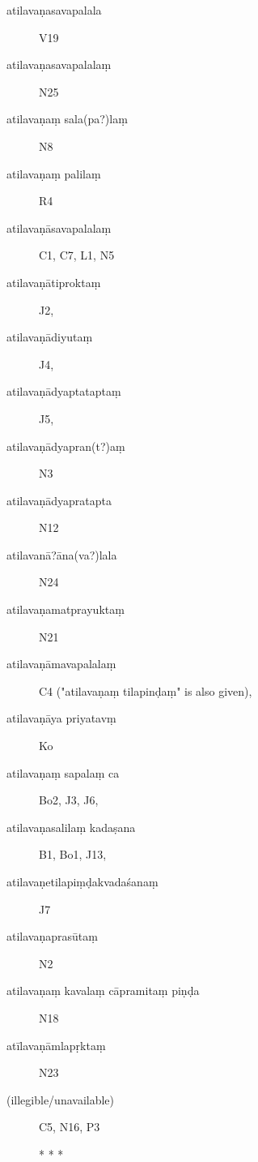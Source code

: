 \begin{ekdosis}
\begin{marma}[hp01_055]
\begin{marma}[hp01_060]
\begin{description}
      \item[atilavaṇasavapalala]        V19
      \item[atilavaṇasavapalalaṃ]   N25
      \item[atilavaṇaṃ sala(pa?)laṃ]   N8
      \item[atilavaṇaṃ palilaṃ]         R4
      \item[atilavaṇāsavapalalaṃ]        C1, C7, L1, N5
      \item[atilavaṇātiproktaṃ]        J2,
      \item[atilavaṇādiyutaṃ]        J4,
      \item[atilavaṇādyaptataptaṃ]        J5,
      \item[atilavaṇādyapran(t?)aṃ]  N3
      \item[atilavaṇādyapratapta]   N12
      \item[atilavanā?āna(va?)lala]   N24
      \item[atilavaṇamatprayuktaṃ]   N21
      \item[atilavaṇāmavapalalaṃ]        C4 ("atilavaṇaṃ tilapinḍaṃ" is also given),
      \item[atilavaṇāya priyatavṃ]        Ko
      \item[atilavaṇaṃ sapalaṃ ca]        Bo2, J3, J6,
      \item[atilavaṇasalilaṃ kadaṣana]        B1, Bo1, J13,
      \item[atilavaṇetilapiṃḍakvadaśanaṃ]        J7
      \item[atilavaṇaprasūtaṃ]         N2
      \item[atilavaṇaṃ kavalaṃ cāpramitaṃ piṇḍa]   N18
      \item[atīlavaṇāmlapṛktaṃ]   N23
      \item[(illegible/unavailable)]  C5, N16, P3

        * * *


\end{description}
\end{marma}
\end{marma}
\end{ekdosis}
